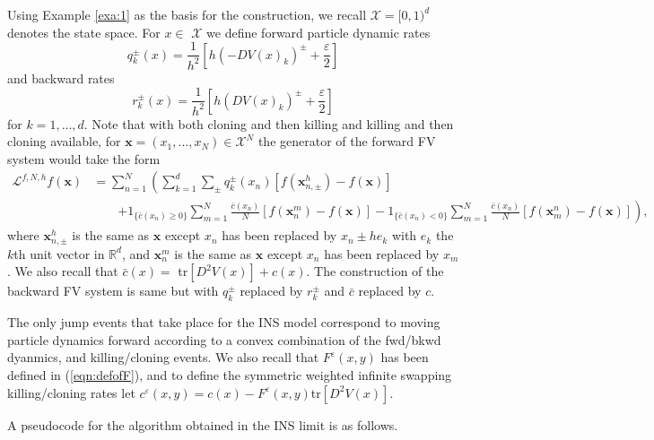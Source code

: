 \documentclass[english,11pt]{article}%
\numberwithin{equation}{section}
\numberwithin{example}{section}
\numberwithin{theorem}{section}
\begin{document}
Using Example \ref{exa:1} as the basis for the construction, we recall
$\mathcal{X}=[0,1)^{d}$ denotes the state space. For $x\in$ $\mathcal{X}$ we
define forward particle dynamic rates
\[
q_{k}^{\pm}(x)=\frac{1}{h^{2}}\left[  h(-DV(x)_{k})^{\pm}+\frac{\varepsilon
}{2}\right]
\]
and backward rates
\[
r_{k}^{\pm}(x)=\frac{1}{h^{2}}\left[  h(DV(x)_{k})^{\pm}+\frac{\varepsilon}%
{2}\right]
\]
for $k=1,\ldots,d$. Note that with both cloning and then killing and killing
and then cloning available, for $\boldsymbol{x}=(x_{1},\ldots,x_{N}%
)\in\mathcal{X}^{N}$ the generator of the forward FV system would take the
form
\begin{align*}
\mathcal{L}^{f,N,h}f(\boldsymbol{x}) &  =\sum_{n=1}^{N}\left(  \sum_{k=1}%
^{d}\sum_{\pm}q_{k}^{\pm}(x_{n})\left[  f(\boldsymbol{x}_{n,\pm}%
^{h})-f(\boldsymbol{x})\right]  \right.  \\
&  \quad\quad\left.  +1_{\{\bar{c}(x_{n})\geq0\}}\sum_{m=1}^{N}\frac{\bar
{c}(x_{n})}{N}\left[  f(\boldsymbol{x}_{n}^{m})-f(\boldsymbol{x})\right]
-1_{\{\bar{c}(x_{n})<0\}}\sum_{m=1}^{N}\frac{\bar{c}(x_{n})}{N}\left[
f(\boldsymbol{x}_{m}^{n})-f(\boldsymbol{x})\right]  \right)  ,
\end{align*}
where $\boldsymbol{x}_{n,\pm}^{h}$ is the same as $\boldsymbol{x}$ except
$x_{n}$ has been replaced by $x_{n}\pm he_{k}$ with $e_{k}$ the $k$th unit
vector in $\mathbb{R}^{d}$, and $\boldsymbol{x}_{n}^{m}$ is the same as
$\boldsymbol{x}$ except $x_{n}$ has been replaced by $x_{m}$. We also recall
that $\bar{c}(x)=$ tr$[D^{2}V(x)]+c(x)$. The construction of the backward FV
system is same but with $q_{k}^{\pm}$ replaced by $r_{k}^{\pm}$ and $\bar{c}$
replaced by $c$.

The only jump events that take place for the INS model correspond to moving
particle dynamics forward according to a convex combination of the fwd/bkwd
dyanmics, and killing/cloning events. We also recall that $F^{\varepsilon
}(x,y)$ has been defined in (\ref{eqn:defofF}), and to define the symmetric
weighted infinite swapping killing/cloning rates let $c^{\varepsilon
}(x,y)=c(x)-F^{\varepsilon}(x,y)$tr$[D^{2}V(x)]$.

A pseudocode for the algorithm obtained in the INS limit is as follows.
\end{document}
